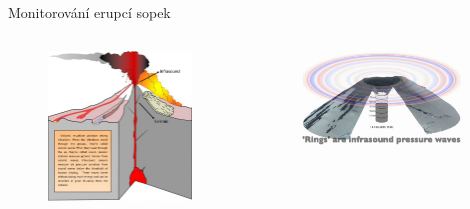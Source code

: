 \documentclass[10pt, notes]{beamer}
\begin{document}
\begin{frame}{Monitorování erupcí sopek}
    \begin{columns}
        \begin{column}{.5\textwidth}
            \begin{figure}[h]
                \includegraphics[height=.6\textheight]{volcano.jpg}
                \caption{\cite{volcano2}}
            \end{figure}
        \end{column}
        \begin{column}{.5\textwidth}
            \begin{figure}[h]
                \includegraphics[height=.4\textheight]{volcano.png}
            \end{figure}
        \end{column}
    \end{columns}
\end{frame}
\end{document}
